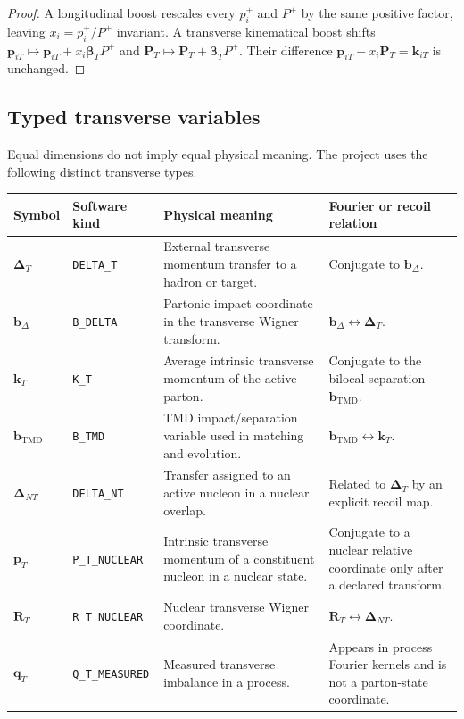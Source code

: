\documentclass[11pt]{article}
\newcommand{\kT}{\bm{k}_{T}}
\newcommand{\pT}{\bm{p}_{T}}
\newcommand{\qT}{\bm{q}_{T}}
\newcommand{\PT}{\bm{P}_{T}}
\newcommand{\DT}{\bm{\Delta}_{T}}
\newcommand{\DNT}{\bm{\Delta}_{N T}}
\newcommand{\bD}{\bm{b}_{\Delta}}
\newcommand{\bM}{\bm{b}_{\mathrm{TMD}}}
\newcommand{\RT}{\bm{R}_{T}}
\begin{document}
\begin{proof}
A longitudinal boost rescales every \(p_i^+\) and \(P^+\) by the same
positive factor, leaving \(x_i=p_i^+/P^+\) invariant.  A transverse
kinematical boost shifts \(\bm p_{iT}\mapsto\bm p_{iT}+x_i\bm\beta_T P^+\)
and \(\PT\mapsto\PT+\bm\beta_TP^+\).  Their difference
\(\bm p_{iT}-x_i\PT=\bm k_{iT}\) is unchanged.
\end{proof}

\subsection{Typed transverse variables}
\label{sec:typed-transverse}

Equal dimensions do not imply equal physical meaning.  The project uses the
following distinct transverse types.

\begin{longtable}{L{0.14\textwidth}L{0.22\textwidth}L{0.28\textwidth}L{0.25\textwidth}}
\toprule
Symbol & Software kind & Physical meaning & Fourier or recoil relation\\
\midrule
\endhead
\(\DT\) & \texttt{DELTA\_T} & External transverse momentum transfer to a hadron or target. & Conjugate to \(\bD\).\\
\(\bD\) & \texttt{B\_DELTA} & Partonic impact coordinate in the transverse Wigner transform. & \(\bD\leftrightarrow\DT\).\\
\(\kT\) & \texttt{K\_T} & Average intrinsic transverse momentum of the active parton. & Conjugate to the bilocal separation \(\bM\).\\
\(\bM\) & \texttt{B\_TMD} & TMD impact/separation variable used in matching and evolution. & \(\bM\leftrightarrow\kT\).\\
\(\DNT\) & \texttt{DELTA\_NT} & Transfer assigned to an active nucleon in a nuclear overlap. & Related to \(\DT\) by an explicit recoil map.\\
\(\pT\) & \texttt{P\_T\_NUCLEAR} & Intrinsic transverse momentum of a constituent nucleon in a nuclear state. & Conjugate to a nuclear relative coordinate only after a declared transform.\\
\(\RT\) & \texttt{R\_T\_NUCLEAR} & Nuclear transverse Wigner coordinate. & \(\RT\leftrightarrow\DNT\).\\
\(\qT\) & \texttt{Q\_T\_MEASURED} & Measured transverse imbalance in a process. & Appears in process Fourier kernels and is not a parton-state coordinate.\\
\bottomrule
\end{longtable}
\end{document}

